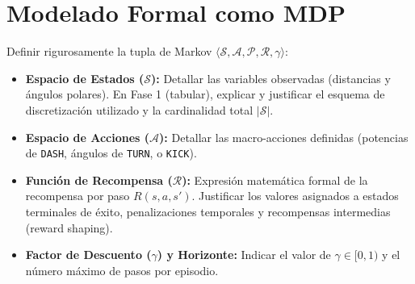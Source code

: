 \section{Modelado Formal como MDP}
Definir rigurosamente la tupla de Markov $\langle \mathcal{S}, \mathcal{A}, \mathcal{P}, \mathcal{R}, \gamma \rangle$:

\begin{itemize}
    \item \textbf{Espacio de Estados ($\mathcal{S}$):} Detallar las variables observadas (distancias y ángulos polares). En Fase 1 (tabular), explicar y justificar el esquema de discretización utilizado y la cardinalidad total $|\mathcal{S}|$.
    \item \textbf{Espacio de Acciones ($\mathcal{A}$):} Detallar las macro-acciones definidas (potencias de \texttt{DASH}, ángulos de \texttt{TURN}, o \texttt{KICK}).
    \item \textbf{Función de Recompensa ($\mathcal{R}$):} Expresión matemática formal de la recompensa por paso $R(s, a, s')$. Justificar los valores asignados a estados terminales de éxito, penalizaciones temporales y recompensas intermedias (reward shaping).
    \item \textbf{Factor de Descuento ($\gamma$) y Horizonte:} Indicar el valor de $\gamma \in [0, 1)$ y el número máximo de pasos por episodio.
\end{itemize}
